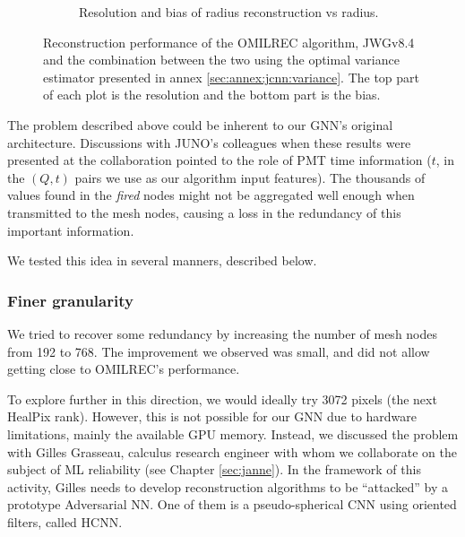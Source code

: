 \documentclass[../main.tex]{subfiles}
\begin{document}
\begin{figure}[ht]
\begin{subfigure}[t]{0.48\linewidth}
    \caption{Resolution and bias of radius reconstruction vs radius.}
    \label{fig:jgnn:MSBvRTC}
  \end{subfigure}
  \caption{Reconstruction performance of the OMILREC algorithm, JWGv8.4 and the combination between the two using the optimal variance estimator presented in annex \ref{sec:annex:jcnn:variance}. The top part of each plot is the resolution and the bottom part is the bias.}
  \label{fig:jgnn:results_2}
\end{figure}

The problem described above could be inherent to our GNN's original architecture. Discussions with JUNO's colleagues when these results were presented at the collaboration pointed to the role of PMT time information ($t$, in the $(Q,t)$ pairs we use as our algorithm input features). The thousands of values found in the \textit{fired} nodes might not be aggregated well enough when transmitted to the mesh nodes, causing a loss in the redundancy of this important information.

We tested this idea in several manners, described below.

\subsubsection{Finer granularity}

We tried to recover some redundancy by increasing the number of mesh nodes from 192 to 768. The improvement we observed was small, and did not allow getting close to OMILREC's performance.

To explore further in this direction, we would ideally try 3072 pixels (the next HealPix rank). However, this is not possible for our GNN due to hardware limitations, mainly the available GPU memory. Instead, we discussed the problem with Gilles Grasseau, calculus research engineer with whom we collaborate on the subject of ML reliability (see Chapter \ref{sec:janne}). In the framework of this activity, Gilles needs to develop reconstruction algorithms to be ``attacked'' by a prototype Adversarial NN. One of them is a pseudo-spherical CNN using oriented filters, called HCNN.
\end{document}

